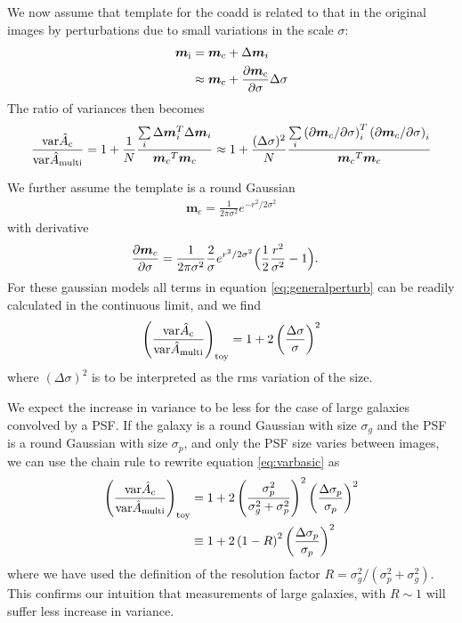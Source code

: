 \documentclass[a4paper,fleqn,usenatbib,referee]{mnras}
\newcommand{\model}{\mbox{$\boldsymbol{m}$}}
\newcommand{\modelc}{\mbox{$\boldsymbol{m}_c$}}
\begin{document}
We now assume that template for the coadd is related to that
in the original images by perturbations due to small variations
in the scale $\sigma$:
\begin{align}
    \boldsymbol{m}_{\rm i} &= \boldsymbol{m}_{\rm c} + \Delta \boldsymbol{m}_i \\
                           &\approx \boldsymbol{m}_{\rm c} + \frac{\partial \boldsymbol{m}_{\rm c}}{\partial \sigma} \Delta \sigma
\end{align}
The ratio of variances then becomes
\begin{align} \label{eq:generalperturb}
    \frac{ {\rm var} \hat{A}_{\rm c} }{{\rm var} \hat{A}_{\rm multi} } = 
    1 + \frac{1}{N}\frac{\sum\limits_i \Delta \model_i^T \Delta \model_i }{\modelc^T \modelc} \approx 
    1 + \frac{(\Delta \sigma)^2}{N}\frac{\sum\limits_i \left( \partial \modelc/\partial \sigma \right)_i^T \left( \partial \modelc/\partial \sigma \right)_i }{\modelc^T \modelc}
\end{align}

We further assume the template is a round Gaussian
\begin{align}
    \modelc = \frac{1}{2 \pi \sigma^2} e^{-r^2/2 \sigma^2 }
\end{align}
with derivative
\begin{align}
    \frac{\partial \modelc}{\partial \sigma} &= \frac{1}{2 \pi \sigma^2} \frac{2}{\sigma} e^{r^2/2 \sigma^2} \Bigl( \frac{1}{2}\frac{r^2}{\sigma^2} - 1 \Bigr).
\end{align}
For these gaussian models all terms in equation \ref{eq:generalperturb} can
be readily calculated in the continuous limit, and we find
\begin{align} \label{eq:varbasic}
    \left( \frac{ {\rm var} \hat{A}_{\rm c} }{{\rm var} \hat{A}_{\rm multi} } \right)_{\rm toy} = 
    1 + 2 \left( \frac{\Delta \sigma}{\sigma} \right)^2
\end{align}
where $(\Delta \sigma)^2$ is to be interpreted as the rms variation
of the size.

We expect the increase in variance to be less for the case
of large galaxies convolved by a PSF.  If the galaxy is a round Gaussian with
size $\sigma_g$ and the PSF is a round Gaussian with size $\sigma_p$,
and only the PSF size varies between images,
we can use the chain rule to rewrite equation \ref{eq:varbasic} as
\begin{align} \label{eq:vargal}
    \left( \frac{ {\rm var} \hat{A}_{\rm c} }{{\rm var} \hat{A}_{\rm multi} } \right)_{\rm toy} &= 
    1 + 2 \left( \frac{\sigma_p^2}{\sigma_g^2 + \sigma_p^2}\right)^2 \left( \frac{\Delta \sigma_p}{\sigma_p} \right)^2 \\
    &\equiv 1 + 2 \left( 1 - R \right)^2 \left( \frac{\Delta \sigma_p}{\sigma_p} \right)^2
\end{align}
where we have used the definition of the resolution factor $R =
\sigma_g^2/(\sigma_p^2 + \sigma_g^2)$.  This confirms our
intuition that measurements of large galaxies, with $R \sim 1$ will suffer
less increase in variance.
\end{document}
